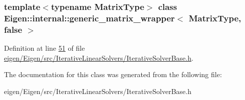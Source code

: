 \subsubsection*{template$<$typename Matrix\+Type$>$\newline
class Eigen\+::internal\+::generic\+\_\+matrix\+\_\+wrapper$<$ Matrix\+Type, false $>$}



Definition at line \hyperlink{eigen_2_eigen_2src_2_iterative_linear_solvers_2_iterative_solver_base_8h_source_l00051}{51} of file \hyperlink{eigen_2_eigen_2src_2_iterative_linear_solvers_2_iterative_solver_base_8h_source}{eigen/\+Eigen/src/\+Iterative\+Linear\+Solvers/\+Iterative\+Solver\+Base.\+h}.



The documentation for this class was generated from the following file\+:\begin{DoxyCompactItemize}
\item 
eigen/\+Eigen/src/\+Iterative\+Linear\+Solvers/\+Iterative\+Solver\+Base.\+h\end{DoxyCompactItemize}
